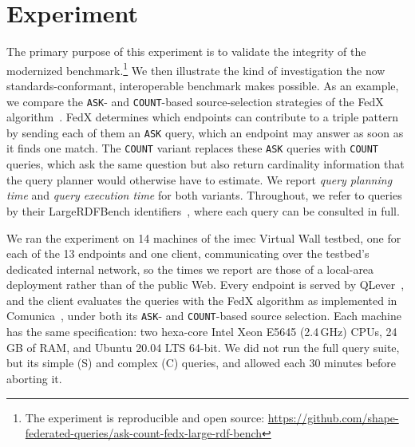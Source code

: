 \section{Experiment}
\label{sec:experiment}

The primary purpose of this experiment is to validate the integrity of the modernized benchmark.\footnote{The experiment is reproducible and open source: \url{https://github.com/shape-federated-queries/ask-count-fedx-large-rdf-bench}}
We then illustrate the kind of investigation the now standards-conformant, interoperable benchmark makes possible.
As an example, we compare the \texttt{ASK}- and \texttt{COUNT}-based source-selection strategies of the FedX algorithm~\cite{schwarte2011fedx}.
FedX determines which endpoints can contribute to a triple pattern by sending each of them an \texttt{ASK} query, which an endpoint may answer as soon as it finds one match.
The \texttt{COUNT} variant replaces these \texttt{ASK} queries with \texttt{COUNT} queries, which ask the same question but also return cardinality information that the query planner would otherwise have to estimate.
We report \emph{query planning time} and \emph{query execution time} for both variants.
Throughout, we refer to queries by their LargeRDFBench identifiers~\cite{saleem2018largerdfbench}, where each query can be consulted in full.

We ran the experiment on 14 machines of the imec Virtual Wall testbed, one for each of the 13 endpoints and one client, communicating over the testbed's dedicated internal network, so the times we report are those of a local-area deployment rather than of the public Web.
Every endpoint is served by QLever~\cite{bast2017qlever}, and the client evaluates the queries with the FedX algorithm as implemented in Comunica~\cite{taelman_iswc_resources_comunica_2018}, under both its \texttt{ASK}- and \texttt{COUNT}-based source selection.
Each machine has the same specification: two hexa-core Intel Xeon E5645 (2.4\,GHz) CPUs, 24\,GB of RAM, and Ubuntu 20.04 LTS 64-bit.
We did not run the full query suite, but its simple (S) and complex (C) queries, and allowed each 30 minutes before aborting it.

